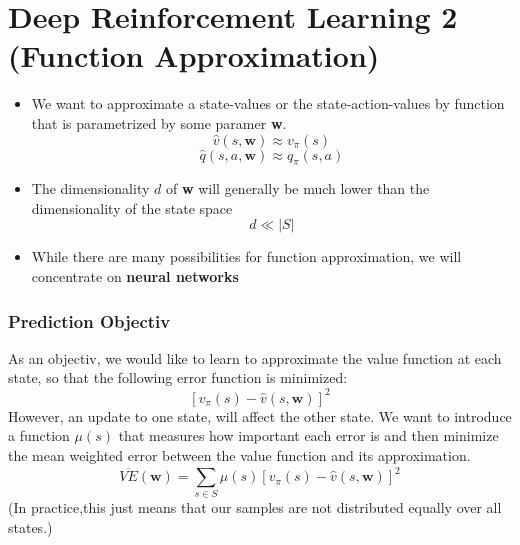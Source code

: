 \section{Deep Reinforcement Learning 2 (Function Approximation)}
\begin{itemize}
    \item We want to approximate a state-values or the state-action-values by function that is parametrized by some paramer \textbf{w}.
    \[
    \hat{v}(s,\boldsymbol{w}) \approx v_\pi(s)
    \]
    \[
    \hat{q}(s,a,\boldsymbol{w}) \approx q_\pi(s,a)
    \]
    \item The dimensionality \(d\) of \textbf{w} will generally be much lower than the dimensionality of the state space
    \[
    d \ll |S|
    \]
    \item While there are many possibilities for function approximation, we will concentrate on \textbf{neural networks}
\end{itemize}
\subsubsection*{Prediction Objectiv}
As an objectiv, we would like to learn to approximate the value function at each state, so that the following error function is minimized:
\[
\left[v_\pi(s)-\hat{v}(s,\boldsymbol{w})\right]^2
\]
However, an update to one state, will affect the other state.
We want to introduce a function \(\mu(s)\) that measures how important each error is and then minimize the mean weighted error between the value function and its approximation.
\[
\overline{VE}(\boldsymbol{w}) = \sum_{s\in S}^{}\mu(s)\left[v_\pi(s)-\hat{v}(s,\boldsymbol{w})\right]^2
\]
(In practice,this just means that our samples are not distributed equally over all states.)
